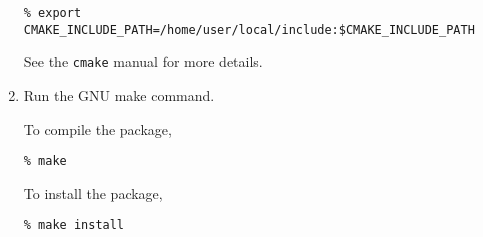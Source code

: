 \begin{enumerate}
       \texttt{\% export CMAKE\_INCLUDE\_PATH=/home/user/local/include:\$CMAKE\_INCLUDE\_PATH}
       \vspace{5mm}

       See the \texttt{cmake} manual for more details\cite{cmake}.



       

 \item Run the GNU make command.

   To compile the package,

       \vspace{5mm}
       \texttt{\% make}
       \vspace{5mm}

   To install the package,

       \vspace{5mm}
       \texttt{\% make install}
       \vspace{5mm}

\end{enumerate}
